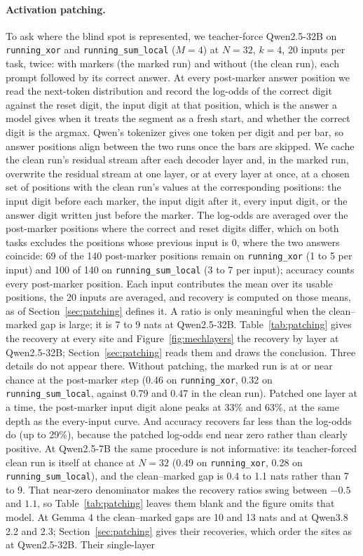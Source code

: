 \documentclass[10pt]{article} %
\newcommand{\task}[1]{\texttt{#1}}
\begin{document}
\paragraph{Activation patching.}
\label{app:patching}
To ask where the blind spot is represented, we teacher-force Qwen2.5-32B on \task{running\_xor} and \task{running\_sum\_local} ($M = 4$) at $N = 32$, $k = 4$, 20 inputs per task, twice: with markers (the marked run) and without (the clean run), each prompt followed by its correct answer. At every post-marker answer position we read the next-token distribution and record the log-odds of the correct digit against the reset digit, the input digit at that position, which is the answer a model gives when it treats the segment as a fresh start, and whether the correct digit is the argmax. Qwen's tokenizer gives one token per digit and per bar, so answer positions align between the two runs once the bars are skipped. We cache the clean run's residual stream after each decoder layer and, in the marked run, overwrite the residual stream at one layer, or at every layer at once, at a chosen set of positions with the clean run's values at the corresponding positions: the input digit before each marker, the input digit after it, every input digit, or the answer digit written just before the marker. The log-odds are averaged over the post-marker positions where the correct and reset digits differ, which on both tasks excludes the positions whose previous input is 0, where the two answers coincide: 69 of the 140 post-marker positions remain on \task{running\_xor} (1 to 5 per input) and 100 of 140 on \task{running\_sum\_local} (3 to 7 per input); accuracy counts every post-marker position. Each input contributes the mean over its usable positions, the 20 inputs are averaged, and recovery is computed on those means, as  of Section~\ref{sec:patching} defines it. A ratio is only meaningful when the clean--marked gap is large; it is 7 to 9 nats at Qwen2.5-32B. Table~\ref{tab:patching} gives the recovery at every site and Figure~\ref{fig:mechlayers} the recovery by layer at Qwen2.5-32B; Section~\ref{sec:patching} reads them and draws the conclusion. Three details do not appear there. Without patching, the marked run is at or near chance at the post-marker step (0.46 on \task{running\_xor}, 0.32 on \task{running\_sum\_local}, against 0.79 and 0.47 in the clean run). Patched one layer at a time, the post-marker input digit alone peaks at 33\% and 63\%, at the same depth as the every-input curve. And accuracy recovers far less than the log-odds do (up to 29\%), because the patched log-odds end near zero rather than clearly positive. At Qwen2.5-7B the same procedure is not informative: its teacher-forced clean run is itself at chance at $N = 32$ (0.49 on \task{running\_xor}, 0.28 on \task{running\_sum\_local}), and the clean--marked gap is 0.4 to 1.1 nats rather than 7 to 9. That near-zero denominator makes the recovery ratios swing between $-0.5$ and $1.1$, so Table~\ref{tab:patching} leaves them blank and the figure omits that model. At Gemma 4 the clean--marked gaps are 10 and 13 nats and at Qwen3.8 2.2 and 2.3; Section~\ref{sec:patching} gives their recoveries, which order the sites as at Qwen2.5-32B. Their single-layer 
\end{document}
